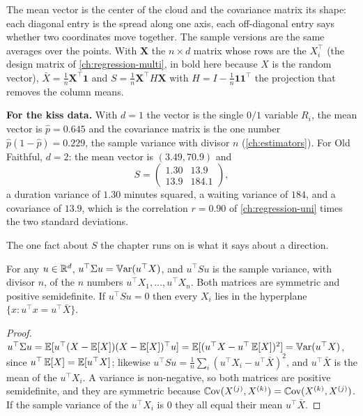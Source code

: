 \begin{inwords}
The mean vector is the center of the cloud and the covariance matrix its shape: each diagonal entry is the spread along one axis, each off-diagonal entry says whether two coordinates move together. The sample versions are the same averages over the points. With $\mathbf{X}$ the $n \times d$ matrix whose rows are the $X_i^\top$ (the design matrix of \cref{ch:regression-multi}, in bold here because $X$ is the random vector), $\bar{X} = \frac1n\mathbf{X}^\top\mathbf{1}$ and $S = \frac1n\mathbf{X}^\top H\mathbf{X}$ with $H = I - \frac1n\mathbf{1}\mathbf{1}^\top$ the projection that removes the column means.

\textbf{For the kiss data.} With $d = 1$ the vector is the single $0/1$ variable $R_i$, the mean vector is $\hat{p} = 0.645$ and the covariance matrix is the one number $\hat{p}(1 - \hat{p}) = 0.229$, the sample variance with divisor $n$ (\cref{ch:estimators}). For Old Faithful, $d = 2$: the mean vector is $(3.49, 70.9)$ and
\[
S = \begin{pmatrix} 1.30 & 13.9 \\ 13.9 & 184.1 \end{pmatrix},
\]
a duration variance of $1.30$ minutes squared, a waiting variance of $184$, and a covariance of $13.9$, which is the correlation $r = 0.90$ of \cref{ch:regression-uni} times the two standard deviations.
\end{inwords}

The one fact about $S$ the chapter runs on is what it says about a direction.

\begin{proposition}
\label{prop:pca-direction}
For any $u \in \mathbb{R}^d$, $u^\top\Sigma u = \operatorname*{\mathbb{V}\text{ar}}(u^\top X)$, and $u^\top Su$ is the sample variance, with divisor $n$, of the $n$ numbers $u^\top X_1, \ldots, u^\top X_n$.
Both matrices are symmetric and positive semidefinite.
If $u^\top Su = 0$ then every $X_i$ lies in the hyperplane $\{x : u^\top x = u^\top\bar{X}\}$.
\end{proposition}
\begin{proof}
$u^\top\Sigma u = \operatorname*{\mathbb{E}}[u^\top(X - \operatorname*{\mathbb{E}}[X])(X - \operatorname*{\mathbb{E}}[X])^\top u] = \operatorname*{\mathbb{E}}[(u^\top X - u^\top\operatorname*{\mathbb{E}}[X])^2] = \operatorname*{\mathbb{V}\text{ar}}(u^\top X)$, since $u^\top\operatorname*{\mathbb{E}}[X] = \operatorname*{\mathbb{E}}[u^\top X]$; likewise $u^\top Su = \frac1n\sum_i(u^\top X_i - u^\top\bar{X})^2$, and $u^\top\bar{X}$ is the mean of the $u^\top X_i$.
A variance is non-negative, so both matrices are positive semidefinite, and they are symmetric because $\operatorname*{\mathbb{C}\text{ov}}(X^{(j)}, X^{(k)}) = \operatorname*{\mathbb{C}\text{ov}}(X^{(k)}, X^{(j)})$.
If the sample variance of the $u^\top X_i$ is $0$ they all equal their mean $u^\top\bar{X}$.
\end{proof}


